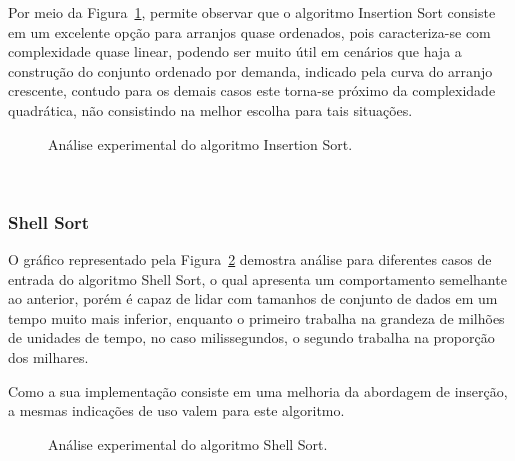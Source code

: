 \documentclass[conference,onecolumn]{IEEEtran}
\begin{document}
Por meio da Figura~\ref{image: graph-insertion}, permite observar que o algoritmo Insertion Sort consiste em um excelente opção para arranjos quase ordenados, pois caracteriza-se com complexidade quase linear, podendo ser muito útil em cenários que haja a construção do conjunto ordenado por demanda, indicado pela curva do arranjo crescente, contudo para os demais casos este torna-se próximo da complexidade quadrática, não consistindo na melhor escolha para tais situações.

\begin{figure}[H]

\centering
{}
\caption{Análise experimental do algoritmo Insertion Sort.}
\label{image: graph-insertion}
\end{figure}
~\\
\subsubsection{Shell Sort}
O gráfico representado pela Figura~\ref{image: graph-shell} demostra análise para diferentes casos de entrada do algoritmo Shell Sort, o qual apresenta um comportamento semelhante ao anterior, porém é capaz de lidar com tamanhos de conjunto de dados em um tempo muito mais inferior, enquanto o primeiro trabalha na grandeza de milhões de unidades de tempo, no caso milissegundos, o segundo trabalha na proporção dos milhares. 

Como a sua implementação consiste em uma melhoria da abordagem de inserção, a mesmas indicações de uso valem para este algoritmo.


\begin{figure}[H]

\centering
{}
\caption{Análise experimental do algoritmo Shell Sort.}
\label{image: graph-shell}
\end{figure}
~\\
\end{document}
